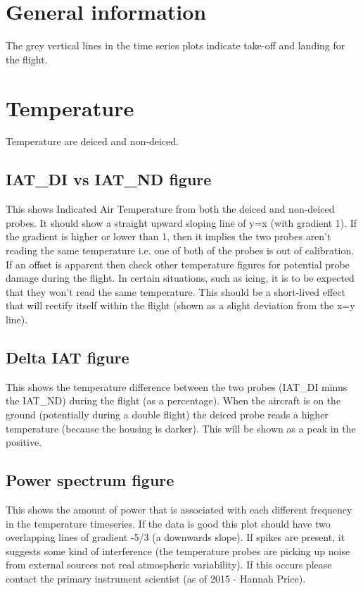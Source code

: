 \section*{General information}
The grey vertical lines in the time series plots indicate take-off and landing for the flight. 

\section*{Temperature}
Temperature are deiced and non-deiced. 

\subsection*{IAT_DI vs IAT_ND figure}
This shows Indicated Air Temperature from both the deiced and non-deiced probes. It should show a straight upward sloping line of y=x (with gradient 1). If the gradient is higher or lower than 1, then it implies the two 
probes aren't reading the same temperature i.e. one of both of the probes is out of calibration. If an offset is apparent then check other temperature figures for potential probe damage during the flight. In certain situations, such as icing, it is to be expected that they won't read the same temperature. This should be a short-lived
effect that will rectify itself within the flight (shown as a slight deviation from the x=y line). 

\subsection*{Delta IAT figure}
This shows the temperature difference between the two probes (IAT_DI minus the IAT_ND) during the flight (as a percentage). When the aircraft is on the ground (potentially during a double flight) the deiced probe reads
a higher temperature (because the housing is darker). This will be shown as a peak in the positive. 

\subsection*{Power spectrum figure}
This shows the amount of power that is associated with each different frequency in the temperature timeseries. If the data is good this plot should have two overlapping lines of gradient -5/3 (a downwards slope).
If spikes are present, it suggests some kind of interference (the temperature probes are picking up noise from external sources not real atmospheric variability). If this occurs please contact the primary instrument scientist
(as of 2015 - Hannah Price).  

